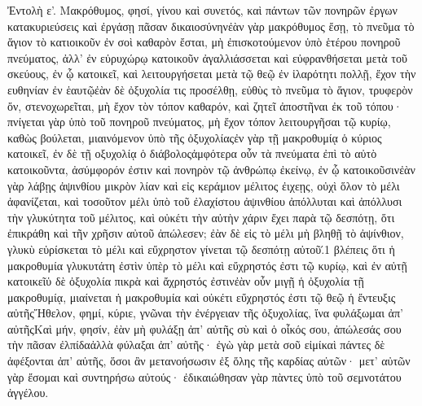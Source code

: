 Ἐντολὴ ε’.
Μακρόθυμος, φησί, γίνου καὶ συνετός, καὶ πάντων τῶν πονηρῶν ἐργων κατακυριεύσεις καὶ ἐργάσῃ πᾶσαν δικαιοσύνηνἐὰν γὰρ μακρόθυμος ἔσῃ, τὸ πνεῦμα τὸ ἅγιον τὸ κατιοικοῦν ἐν σοὶ καθαρὸν ἔσται, μὴ ἐπισκοτούμενον ὑπὸ ἑτέρου πονηροῦ πνεύματος, ἀλλ’ ἐν εὐρυχώρῳ κατοικοῦν ἀγαλλιάσσεται καὶ εὐφρανθήσεται μετὰ τοῦ σκεύους, ἐν ᾧ κατοικεῖ, καὶ λειτουργήσεται μετὰ τῷ θεῷ ἐν ἱλαρότητι πολλῇ, ἔχον τὴν ευθηνίαν ἐν ἑαυτῷἐὰν δὲ ὀξυχολία τις προσέλθῃ, εὐθὺς τὸ πνεῦμα τὸ ἅγιον, τρυφερὸν ὄν, στενοχωρεῖται, μὴ ἔχον τὸν τόπον καθαρόν, καὶ ζητεῖ ἀποστῆναι ἐκ τοῦ τόπου· πνίγεται γὰρ ὑπὸ τοῦ πονηροῦ πνεύματος, μὴ ἔχον τόπον λειτουργῆσαι τῷ κυρίῳ, καθὼς βούλεται, μιαινόμενον ὑπὸ τῆς ὀξυχολίαςἐν γὰρ τῇ μακροθυμίᾳ ὁ κύριος κατοικεῖ, ἐν δὲ τῇ οξυχολίᾳ ὁ διάβολοςἀμφότερα οὖν τὰ πνεύματα ἐπὶ τὸ αὐτὸ κατοικοῦντα, ἀσύμφορόν ἐστιν καὶ πονηρὸν τῷ ἀνθρώπῳ ἐκείνῳ, ἐν ᾧ κατοικοῦσινἐὰν γὰρ λάβῃς ἀψινθίου μικρὸν λίαν καὶ εἰς κεράμιον μέλιτος ἐιχεῃς, οὐχὶ ὅλον τὸ μέλι ἀφανίζεται, καὶ τοσοῦτον μέλι ὑπὸ τοῦ ἐλαχίστου ἀψινθίου ἀπόλλυται καὶ ἀπόλλυσι τὴν γλυκύτητα τοῦ μέλιτος, καὶ οὐκέτι τὴν αὐτὴν χάριν ἔχει παρὰ τῷ δεσπότῃ, ὅτι ἐπικράθη καὶ τῆν χρῆσιν αὐτοῦ ἀπώλεσεν; ἐὰν δὲ εἰς τὸ μέλι μὴ βληθῇ τὸ ἀψίνθιον, γλυκὺ εὑρίσκεται τὸ μέλι καὶ εὔχρηστον γίνεται τῷ δεσπότῃ αὐτοῦ.́1 βλέπεις ὅτι ἡ μακροθυμία γλυκυτάτη ἐστὶν ὑπὲρ τὸ μέλι καὶ εὔχρηστός ἐστι τῷ κυρίῳ, καὶ ἐν αὐτῇ κατοικεῖὑ δὲ ὀξυχολία πικρὰ καὶ ἄχρηστός ἐστινἐὰν οὖν μιγῇ ἡ ὀξυχολία τῇ μακροθυμίᾳ, μιαίνεται ἡ μακροθυμία καὶ οὐκέτι εὔχρηστός ἐστι τῷ θεῷ ἡ ἔντευξις αὐτῆςἬθελον, φημί, κύριε, γνῶναι τὴν ἐνέργειαν τῆς ὀξυχολίας, ἵνα φυλάξωμαι ἀπ’ αὐτῆςΚαὶ μήν, φησίν, ἐὰν μὴ φυλάξῃ ἀπ’ αὐτῆς σὺ καὶ ὁ οἶκός σου, ἀπώλεσάς σου τὴν πᾶσαν ἐλπίδαἀλλὰ φύλαξαι ἀπ’ αὐτῆς· ἐγὼ γὰρ μετὰ σοῦ εἰμίκαὶ πάντες δὲ ἀφέξονται ἀπ’ αὐτῆς, ὅσοι ἂν μετανοήσωσιν ἐξ ὅλης τῆς καρδίας αὐτῶν· μετ’ αὐτῶν γὰρ ἔσομαι καὶ συντηρήσω αὐτούς· ἐδικαιώθησαν γὰρ πὰντες ὑπὸ τοῦ σεμνοτάτου ἀγγέλου.
